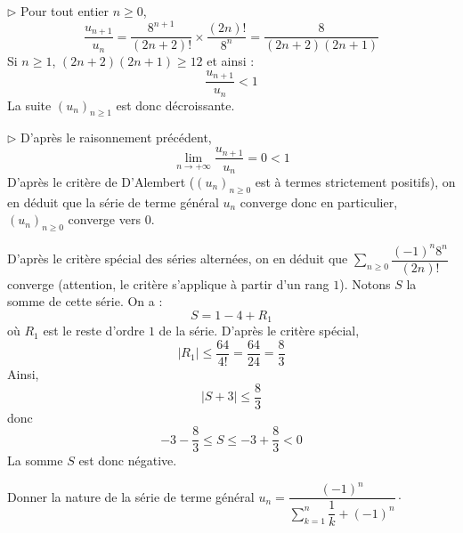 \documentclass[a4paper,twoside,french,10pt]{VcCours}
\newcommand{\Sum}[2]{\ensuremath{\textstyle{\sum\limits_{#1}^{#2}}}}
\begin{document}
\medskip

\noindent $\rhd$ Pour tout entier $n \geq 0$,
$$ \dfrac{u_{n+1}}{u_n} = \dfrac{8^{n+1}}{(2n+2)!} \times \dfrac{(2n)!}{8^n} =\dfrac{8}{(2n+2)(2n+1)}$$
Si $n \geq 1$, $(2n+2)(2n+1) \geq 12$ et ainsi :
$$  \dfrac{u_{n+1}}{u_n} < 1$$
La suite $(u_n)_{n \geq 1}$ est donc décroissante.

\medskip

\noindent $\rhd$ D'après le raisonnement précédent,
$$ \lim_{n \rightarrow + \infty}  \dfrac{u_{n+1}}{u_n} = 0 <1$$
D'après le critère de D'Alembert ($(u_n)_{n \geq 0}$ est à termes strictement positifs), on en déduit que la série de terme général $u_n$ converge donc en particulier, $(u_n)_{n \geq 0}$ converge vers $0$.

\medskip

\noindent D'après le critère spécial des séries alternées, on en déduit que $\Sum{n \geq 0}{} {\dfrac{( - 1)^n 8^n}{(2n)!}}$ converge (attention, le critère s'applique à partir d'un rang $1$). Notons $S$ la somme de cette série. On a :
$$ S= 1 - 4 + R_1$$
où $R_1$ est le reste d'ordre $1$ de la série. D'après le critère spécial, 
$$ \vert R_1 \vert \leq \dfrac{64}{4!} = \dfrac{64}{24} = \dfrac{8}{3}$$
Ainsi, 
$$ \vert S + 3 \vert \leq \dfrac{8}{3}$$
donc 
$$ -3- \dfrac{8}{3} \leq S \leq -3 + \dfrac{8}{3} <0$$
La somme $S$ est donc négative.

\medskip

\begin{Exercice}{} Donner la nature de la série de terme général $u_n = \dfrac{(-1)^n}{\Sum{k=1}{n} \dfrac{1}{k} + (-1)^n} \cdot$
\end{Exercice}
\end{document}
